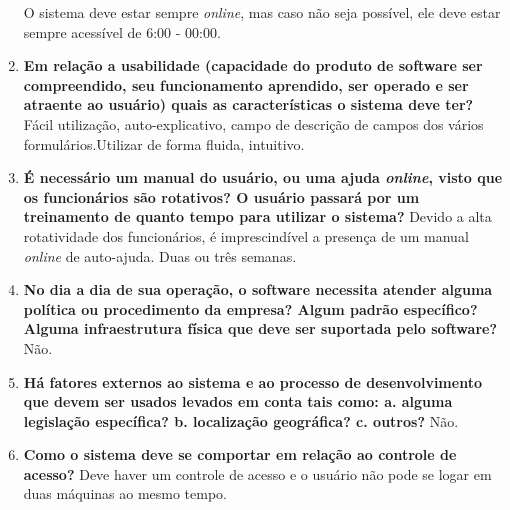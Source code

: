 \begin{enumerate}
 	\subitem O sistema deve estar sempre \textit{online}, mas caso não seja possível, ele deve estar sempre acessível de 6:00 - 00:00.
 \item \textbf{Em relação a usabilidade (capacidade do produto de software ser compreendido, seu funcionamento aprendido, ser operado e ser atraente ao usuário) quais as características o sistema deve ter?}
 	\subitem Fácil utilização, auto-explicativo, campo de descrição de campos dos vários formulários.Utilizar de forma fluida, intuitivo.
 \item \textbf{É necessário um manual do usuário, ou uma ajuda \textit{online}, visto que os funcionários são rotativos? O usuário passará por um treinamento de quanto tempo para utilizar o sistema?}
    \subitem Devido a alta rotatividade dos funcionários, é imprescindível a presença de um manual \textit{online} de auto-ajuda. Duas ou três semanas.
 \item \textbf{No dia a dia de sua operação, o software necessita atender alguma política ou procedimento da empresa? Algum padrão específico? Alguma infraestrutura física que deve ser suportada pelo software?}
    \subitem Não.
 \item \textbf{Há fatores externos ao sistema e ao processo de desenvolvimento que devem ser usados levados em conta tais 
 	 como:
  \subitem a. alguma legislação específica?
  \subitem b. localização geográfica?
  \subitem c. outros?}
 \subitem Não.
 \item \textbf{Como o sistema deve se comportar em relação ao controle de acesso?}
 	\subitem Deve haver um controle de acesso e o usuário não pode se logar em duas máquinas ao mesmo tempo.
\end{enumerate}

